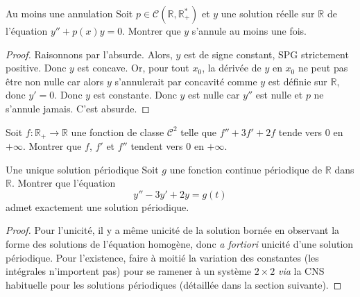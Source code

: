 \documentclass[french,a4paper]{article}
\newcommand{\R}{\mathbb{R}}
\newcommand{\st}{^*}
\theoremstyle{plain}
\theoremstyle{definition}
\theoremstyle{remark}
\begin{document}
\begin{ex}[Moulin.ED.45]{Au moins une annulation}
	Soit $p\in\mathcal{C}(\R,\R_+\st)$ et $y$ une solution réelle sur $\R$ de l'équation $y''+p(x)y=0$. Montrer que $y$ s'annule au moins une fois.
\end{ex}
\begin{proof}
	Raisonnons par l'absurde. Alors, $y$ est de signe constant, SPG strictement positive. Donc $y$ est concave. Or, pour tout $x_0$, la dérivée de $y$ en $x_0$ ne peut pas être non nulle car alors $y$ s'annulerait par concavité comme $y$ est définie sur $\R$, donc $y'=0$. Donc $y$ est constante. Donc $y$ est nulle car $y''$ est nulle et $p$ ne s'annule jamais. C'est absurde.
\end{proof}

\begin{ex}[Moulin.ED.46]{}
	Soit $f:\R_+\to\R$ une fonction de classe $\mathcal{C}^2$ telle que $f''+3f'+2f$ tende vers $0$ en $+\infty$. Montrer que $f$, $f'$ et $f''$ tendent vers $0$ en $+\infty$.
\end{ex}

\begin{ex}[Moulin.ED.47]{Une unique solution périodique}
	Soit $g$ une fonction continue périodique de $\R$ dans $\R$. Montrer que l'équation $$y''-3y'+2y=g(t)$$ admet exactement une solution périodique.
\end{ex}
\begin{proof}
	Pour l'unicité, il y a même unicité de la solution bornée en observant la forme des solutions de l'équation homogène, donc \textit{a fortiori} unicité d'une solution périodique. Pour l'existence, faire à moitié la variation des constantes (les intégrales n'importent pas) pour se ramener à un système $2\times 2$ \textit{via} la CNS habituelle pour les solutions périodiques (détaillée dans la section suivante).
\end{proof}
\end{document}
